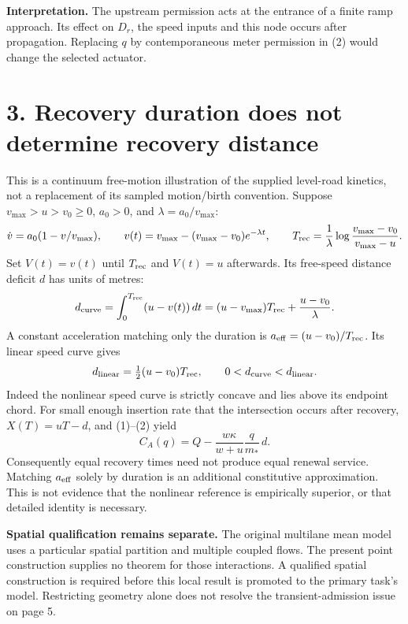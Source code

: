 \documentclass[11pt,a4paper]{article}
\begin{document}
\textbf{Interpretation.} The upstream permission acts at the entrance of a
finite ramp approach. Its effect on $D_r$, the speed inputs and this node occurs
after propagation. Replacing $q$ by contemporaneous meter permission in (2)
would change the selected actuator.

\newpage
\section*{3. Recovery duration does not determine recovery distance}
This is a continuum free-motion illustration of the supplied level-road
kinetics, not a replacement of its sampled motion/birth convention. Suppose
$v_{\max}>u>v_0\ge0$, $a_0>0$, and $\lambda=a_0/v_{\max}$:
\begin{equation}
 \dot v=a_0(1-v/v_{\max}),\qquad
 v(t)=v_{\max}-(v_{\max}-v_0)e^{-\lambda t},\qquad
 T_{\rm rec}=\frac1\lambda\log\frac{v_{\max}-v_0}{v_{\max}-u}.
\end{equation}
Set $V(t)=v(t)$ until $T_{\rm rec}$ and $V(t)=u$ afterwards. Its free-speed
distance deficit $d$ has units of metres:
\begin{equation}
 d_{\rm curve}=\int_0^{T_{\rm rec}}(u-v(t))\,dt
 =(u-v_{\max})T_{\rm rec}+\frac{u-v_0}{\lambda}.
\end{equation}
A constant acceleration matching only the duration is
$a_{\rm eff}=(u-v_0)/T_{\rm rec}$. Its linear speed curve gives
\begin{equation}
 d_{\rm linear}=\tfrac12(u-v_0)T_{\rm rec},\qquad
 0<d_{\rm curve}<d_{\rm linear}.
\end{equation}
Indeed the nonlinear speed curve is strictly concave and lies above its
endpoint chord. For small enough insertion rate that the intersection occurs
after recovery, $X(T)=uT-d$, and (1)--(2) yield
\begin{equation}
 C_A(q)=Q-\frac{w\kappa}{w+u}\frac{q}{m_*}\,d.
\end{equation}
Consequently equal recovery times need not produce equal renewal service.
Matching $a_{\rm eff}$ solely by duration is an additional constitutive
approximation. This is not evidence that the nonlinear reference is empirically
superior, or that detailed identity is necessary.

\textbf{Spatial qualification remains separate.} The original multilane mean
model uses a particular spatial partition and multiple coupled flows. The
present point construction supplies no theorem for those interactions. A
qualified spatial construction is required before this local result is promoted
to the primary task's model. Restricting geometry alone does not resolve the
transient-admission issue on page 5.
\end{document}
